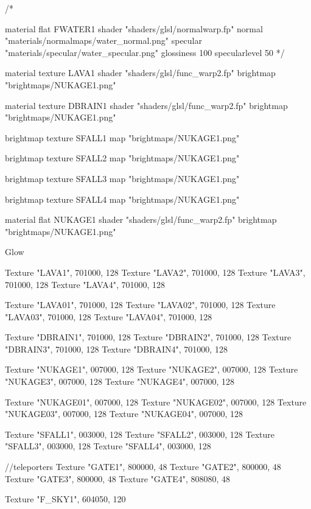 /*

material flat FWATER1 {
	shader "shaders/glsl/normalwarp.fp"
	normal "materials/normalmaps/water_normal.png"
	specular "materials/specular/water_specular.png"
	glossiness 100
	specularlevel 50
}*/

material texture LAVA1 {
	shader "shaders/glsl/func_warp2.fp"
	brightmap "brightmaps/NUKAGE1.png"
}

material texture DBRAIN1 {
	shader "shaders/glsl/func_warp2.fp"
	brightmap "brightmaps/NUKAGE1.png"
}

brightmap texture SFALL1 {
	map "brightmaps/NUKAGE1.png"
}

brightmap texture SFALL2 {
	map "brightmaps/NUKAGE1.png"
}

brightmap texture SFALL3 {
	map "brightmaps/NUKAGE1.png"
}

brightmap texture SFALL4 {
	map "brightmaps/NUKAGE1.png"
}

material flat NUKAGE1 {
	shader "shaders/glsl/func_warp2.fp"
	brightmap "brightmaps/NUKAGE1.png"
}

Glow {
	Texture "LAVA1", 701000, 128
	Texture "LAVA2", 701000, 128
	Texture "LAVA3", 701000, 128
	Texture "LAVA4", 701000, 128
	
	Texture "LAVA01", 701000, 128
	Texture "LAVA02", 701000, 128
	Texture "LAVA03", 701000, 128
	Texture "LAVA04", 701000, 128
	
	Texture "DBRAIN1", 701000, 128
	Texture "DBRAIN2", 701000, 128
	Texture "DBRAIN3", 701000, 128
	Texture "DBRAIN4", 701000, 128
	
	Texture "NUKAGE1", 007000, 128
	Texture "NUKAGE2", 007000, 128
	Texture "NUKAGE3", 007000, 128
	Texture "NUKAGE4", 007000, 128
	
	Texture "NUKAGE01", 007000, 128
	Texture "NUKAGE02", 007000, 128
	Texture "NUKAGE03", 007000, 128
	Texture "NUKAGE04", 007000, 128
	
	Texture "SFALL1", 003000, 128
	Texture "SFALL2", 003000, 128
	Texture "SFALL3", 003000, 128
	Texture "SFALL4", 003000, 128
	
	//teleporters
	Texture "GATE1", 800000, 48
	Texture "GATE2", 800000, 48
	Texture "GATE3", 800000, 48
	Texture "GATE4", 808080, 48
	
	Texture "F_SKY1", 604050, 120
}
